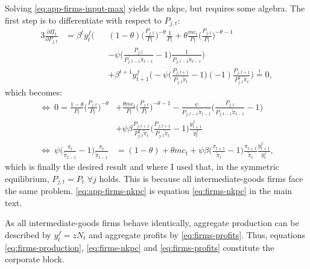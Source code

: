 \documentclass[a4paper,12pt]{article} %
\numberwithin{equation}{section} %
\numberwithin{figure}{section}
\numberwithin{table}{section}
\begin{document}
\begin{refsection}
\begin{appendices}
Solving \eqref{eq:app-firms-input-max} yields the \Gls{nkpc}, but requires some algebra. The first step is to differentiate with respect to $P_{j,t}$:
\begin{alignat}{3}
    \frac{\partial \Pi_t}{\partial P_{j,t}} &= \beta^t y_t^f \Bigg( &&(1-\theta) \Bigg( \frac{P_{j,t}}{P_t} \Bigg)^{-\theta} \frac{1}{P_t} + \theta \frac{mc_t}{P_t} \Bigg( \frac{P_{j,t}}{P_t} \Bigg)^{-\theta-1} \nonumber \\
    & \ &&- \psi \Bigg( \frac{P_{j,t}}{P_{j,t-1} \tilde{\pi}_{t-1}} - 1 \Bigg) \frac{1}{P_{j,t-1} \tilde{\pi}_{t-1}} \Bigg) \nonumber \\
    & \ &&+\beta^{t+1} y_{t+1}^f \Bigg( -\psi \Bigg( \frac{P_{j,t+1}}{P_{j,t} \tilde{\pi}_{t}} - 1 \Bigg) (-1) \frac{P_{j,t+1}}{P_{j,t}^2 \tilde{\pi}_{t}} \Bigg) \overset{!}{=} 0, \nonumber
\end{alignat}
which becomes:
\begin{align}
    \Leftrightarrow \ 0 = \frac{1-\theta}{P_t} \Bigg( \frac{P_{j,t}}{P_t} \Bigg)^{-\theta} &+ \frac{\theta mc_t}{P_t} \Bigg( \frac{P_{j,t}}{P_t} \Bigg)^{-\theta-1} - \frac{\psi}{P_{j,t-1} \tilde{\pi}_{t-1}} \Bigg( \frac{P_{j,t}}{P_{j,t-1} \tilde{\pi}_{t-1}} - 1 \Bigg) \nonumber \\
    &+\psi \beta \frac{P_{j,t+1}}{P_{j,t}^2 \tilde{\pi}_{t}} \Bigg( \frac{P_{j,t+1}}{P_{j,t} \tilde{\pi}_t} - 1 \Bigg) \frac{y_{t+1}^f}{y_t^f} \nonumber \\
    \Leftrightarrow \ \psi \Bigg( \frac{\pi_t}{\tilde{\pi}_{t-1}} - 1 \Bigg) \frac{\pi_t}{\tilde{\pi}_{t-1}} &= (1-\theta) + \theta mc_t + \psi \beta \Bigg( \frac{\pi_{t+1}}{\tilde{\pi}_{t}} - 1 \Bigg) \frac{\pi_{t+1}}{\tilde{\pi}_{t}} \frac{y_{t+1}^f}{y_t^f}, \label{eq:app-firms-nkpc}
\end{align}
which is finally the desired result and where I used that, in the symmetric equilibrium, $P_{j,t} = P_t$ $\forall j$ holds. This is because all intermediate-goods firms face the same problem. \eqref{eq:app-firms-nkpc} is equation \eqref{eq:firms-nkpc} in the main text. 

As all intermediate-goods firms behave identically, aggregate production can be described by $y_t^f = zN_t$ and aggregate profits by \eqref{eq:firms-profits}. Thus, equations \eqref{eq:firms-production}, \eqref{eq:firms-nkpc} and \eqref{eq:firms-profits} constitute the corporate block. 


\end{appendices}
\end{refsection}
\end{document}
